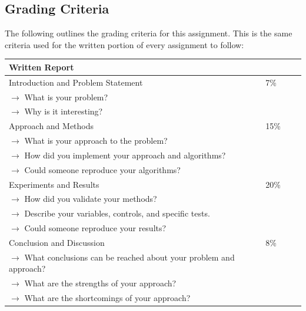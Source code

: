 \subsection{Grading Criteria}

The following outlines the grading criteria for this assignment. This is the same criteria used for the written portion of every assignment to follow:

\vspace{1cm}
\begin{tabular}{|l|l||l|l|}
\hline
{\large \bf Written Report} & \\
\hline
\hline
Introduction and Problem Statement & 7\% \\
$\rightarrow$ What is your problem? & \\
$\rightarrow$ Why is it interesting? & \\
\hline
Approach and Methods & 15\% \\
$\rightarrow$ What is your approach to the problem? & \\
$\rightarrow$ How did you implement your approach and algorithms? & \\
$\rightarrow$ Could someone reproduce your algorithms? & \\
\hline
Experiments and Results & 20\% \\
$\rightarrow$ How did you validate your methods? & \\
$\rightarrow$ Describe your variables, controls, and specific tests. & \\
$\rightarrow$ Could someone reproduce your results? & \\
\hline
Conclusion and Discussion & 8\% \\
$\rightarrow$ What conclusions can be reached about your problem and approach? & \\
$\rightarrow$ What are the strengths of your approach? & \\
$\rightarrow$ What are the shortcomings of your approach? & \\
\hline
\end{tabular}

\newpage
